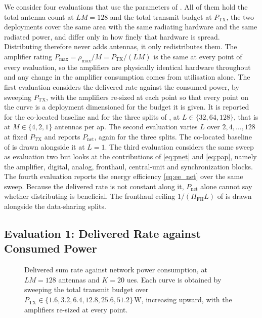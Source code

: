 We consider four evaluations that use the parameters of . All of them hold the total antenna count at $LM=128$ and the total transmit budget at $P_{\mathrm{TX}}$, the two deployments cover the same
area with the same radiating hardware and the same radiated power, and differ
only in how finely that hardware is spread. Distributing therefore never adds
antennas, it only redistributes them. The amplifier rating
$P_{\max}=\rho_{\max}/M=P_{\mathrm{TX}}/(LM)$ is the same at every point of
every evaluation, so the amplifiers are physically identical hardware throughout and
any change in the amplifier consumption comes from utilisation alone. 
The first evaluation considers the delivered rate against the consumed power, by sweeping $P_{\mathrm{TX}}$, with the amplifiers re-sized at each point so that every point on the curve is a deployment dimensioned for the budget it is given. It is reported for the co-located baseline and for the three splits of , at $L\in\{32,64,128\}$, that is at $M\in\{4,2,1\}$ antennas per \gls{ap}. 
The second evaluation varies $L$ over $2,4,\dots,128$ at fixed $P_{\mathrm{TX}}$ and
reports $P_{\mathrm{net}}$, again for the three splits. The co-located baseline of
 is drawn alongside it at $L=1$. 
The third evaluation considers the same sweep as evaluation two but looks at the contributions of \eqref{eq:pnet} and \eqref{eq:pap}, namely the amplifier, digital, analog, fronthaul, central-unit and synchronization blocks. 
The fourth evaluation reports the energy efficiency \eqref{eq:ee_net} over the same sweep.
Because the delivered rate is not constant along it, $P_{\mathrm{net}}$ alone
cannot say whether distributing is beneficial. The fronthaul ceiling $1/(\Pi_{\mathrm{FH}}L)$ of  is drawn alongside the data-sharing splits.

\subsection{Evaluation 1: Delivered Rate against Consumed Power}
\label{ssec:eval_rate_power}

\begin{figure}[t]
\centering

\caption{Delivered sum rate against network power consumption, at $LM=128$
antennas and $K=20$ \glspl{ue}. Each curve is obtained by sweeping the
total transmit budget over $P_{\mathrm{TX}}\in\{1.6,3.2,6.4,12.8,25.6,51.2\}\,\mathrm{W}$, increasing upward, with the amplifiers re-sized at every point.}
\label{fig:eval1}
\end{figure}

